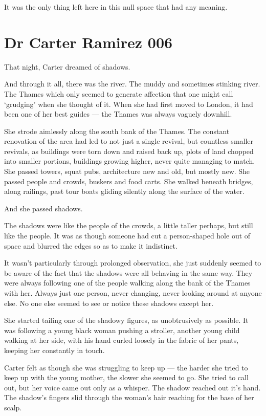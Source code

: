It was the only thing left here in this null space that had any meaning.

\chapter*{Dr Carter Ramirez 006}

That night, Carter dreamed of shadows.

And through it all, there was the river. The muddy and sometimes stinking river. The Thames which only seemed to generate affection that one might call `grudging' when she thought of it. When she had first moved to London, it had been one of her best guides --- the Thames was always vaguely downhill.

She strode aimlessly along the south bank of the Thames. The constant renovation of the area had led to not just a single revival, but countless smaller revivals, as buildings were torn down and raised back up, plots of land chopped into smaller portions, buildings growing higher, never quite managing to match. She passed towers, squat pubs, architecture new and old, but mostly new. She passed people and crowds, buskers and food carts. She walked beneath bridges, along railings, past tour boats gliding silently along the surface of the water.

And she passed shadows.

The shadows were like the people of the crowds, a little taller perhaps, but still like the people. It was as though someone had cut a person-shaped hole out of space and blurred the edges so as to make it indistinct.

It wasn't particularly through prolonged observation, she just suddenly seemed to be aware of the fact that the shadows were all behaving in the same way. They were always following one of the people walking along the bank of the Thames with her. Always just one person, never changing, never looking around at anyone else. No one else seemed to see or notice these shadows except her.

She started tailing one of the shadowy figures, as unobtrusively as possible. It was following a young black woman pushing a stroller, another young child walking at her side, with his hand curled loosely in the fabric of her pants, keeping her constantly in touch.

Carter felt as though she was struggling to keep up --- the harder she tried to keep up with the young mother, the slower she seemed to go. She tried to call out, but her voice came out only as a whisper. The shadow reached out it's hand. The shadow's fingers slid through the woman's hair reaching for the base of her scalp.

